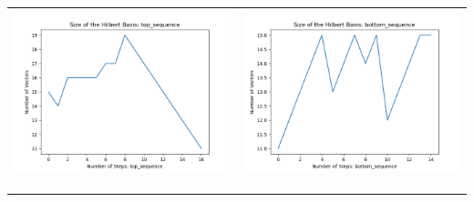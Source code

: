 \documentclass[10pt]{article}
\begin{document}
\begin{tabular}{c|c}
\begin{minipage}{.4\textwidth}
\includegraphics[width=\textwidth]{"DATA/4d/5 generators 2 bound D/top_sequence SIZE"}
\end{minipage} &
\begin{minipage}{.4\textwidth}
\includegraphics[width=\textwidth]{"DATA/4d/5 generators 2 bound D bottomup/bottom_sequence SIZE"}
\end{minipage} \\ \\
\hline \\\begin{minipage}{.4\textwidth}

\end{minipage}
\end{tabular}
\end{document}
